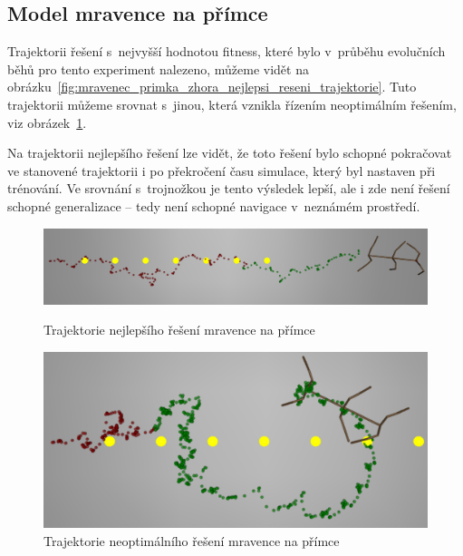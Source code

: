 \clearpage


\subsection{Model mravence na přímce}
Trajektorii řešení s~nejvyšší hodnotou fitness, které bylo v~průběhu evolučních běhů pro tento experiment nalezeno, můžeme vidět na obrázku~\ref{fig:mravenec_primka_zhora_nejlepsi_reseni_trajektorie}.
Tuto trajektorii můžeme srovnat s~jinou, která vznikla řízením neoptimálním řešením, viz obrázek~\ref{fig:mravenec_primka_zhora_neoptimalni_reseni_trajektorie}.

Na trajektorii nejlepšího řešení lze vidět, že toto řešení bylo schopné pokračovat ve stanovené trajektorii i po překročení času simulace, který byl nastaven při trénování.
Ve srovnání s~trojnožkou je tento výsledek lepší, ale i zde není řešení schopné generalizace -- tedy není schopné navigace v~neznámém prostředí.


\begin{figure}[h]
    \begin{minipage}[c]{0.48\linewidth}
        \includegraphics[width=\linewidth]{obrazky/mravenec_primka_zhora_nejlepsi_reseni_trajektorie.png}
        \caption{Trajektorie nejlepšího řešení mravence na přímce}
        \label{fig:mravenec_primka_zhora_nejlepsi_reseni_trajektorie}
    \end{minipage}
    \hfill
    \begin{minipage}[c]{0.48\linewidth}
        \includegraphics[width=\linewidth]{obrazky/mravenec_zhora_neoptimalni_reseni_trajektorie.png}
        \caption{Trajektorie neoptimálního řešení mravence na přímce}
        \label{fig:mravenec_primka_zhora_neoptimalni_reseni_trajektorie}
    \end{minipage}
\end{figure}

